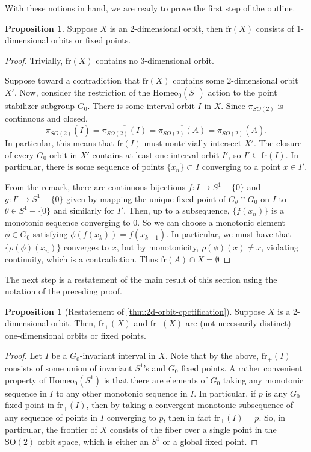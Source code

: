 \documentclass[10pt, oneside]{article}
\newcommand{\SO}[1][2]{\text{SO}(#1)}
\newcommand{\homeo}[1][S^1]{\text{Homeo}_0(#1)}
\theoremstyle{definition}
\newtheorem{prop}{Proposition}[section]
\newtheorem*{prop*}{Proposition}
\theoremstyle{definition}
\begin{document}
With these notions in hand, we are ready to prove the first step of the outline.

\begin{prop}
    Suppose $X$ is an 2-dimensional orbit, then $\text{fr}(X)$ consists of 1-dimensional orbits or fixed points.
\end{prop}

\begin{proof}
    Trivially, $\text{fr}(X)$ contains no 3-dimensional orbit.

    Suppose toward a contradiction that $\text{fr}(X)$ contains some 2-dimensional orbit $X'$. Now, consider the restriction of the $\homeo$ action to the point stabilizer subgroup $G_0$. There is some interval orbit $I$ in $X$. Since $\pi_{SO(2)}$ is continuous and closed, $$\pi_{SO(2)}(\bar{I}) = \overline{\pi_{SO(2)}(I)} = \overline{\pi_{SO(2)}(A)} = \pi_{SO(2)}(\bar{A}).$$ In particular, this means that $\text{fr}(I)$ must nontrivially intersect $X'$. The closure of every $G_0$ orbit in $X'$ contains at least one interval orbit $I'$, so $I'\subseteq \text{fr}(I)$. In particular, there is some sequence of points $\{x_n\}\subset I$ converging to a point $x\in I'$.

    From the remark, there are continuous bijections $f:I\to S^1-\{0\}$ and $g:I'\to S^1-\{0\}$ given by mapping the unique fixed point of $G_\theta\cap G_0$ on $I$ to $\theta\in S^1 - \{0\}$ and similarly for $I'$. Then, up to a subsequence, $\{f(x_n)\}$ is a monotonic sequence converging to 0. So we can choose a monotonic element $\phi\in G_0$ satisfying $\phi(f(x_k)) = f(x_{k+1})$. In particular, we must have that $\{\rho(\phi)( x_n)\}$ converges to $x$, but by monotonicity, $\rho(\phi)(x) \neq x$, violating continuity, which is a contradiction. Thus $\text{fr}(A)\cap X = \emptyset$
\end{proof}

The next step is a restatement of the main result of this section using the notation of the preceding proof.

\begin{prop*}[Restatement of \cref{thm:2d-orbit-cpctification}]
    Suppose $X$ is a 2-dimensional orbit. Then, $\text{fr}_+(X)$ and $\text{fr}_-(X)$ are (not necessarily distinct) one-dimensional orbits or fixed points.
\end{prop*}

\begin{proof}
     Let $I$ be a $G_0$-invariant interval in $X$. Note that by the above, $\text{fr}_+(I)$ consists of some union of invariant $S^1$'s and $G_0$ fixed points. A rather convenient property of $\homeo$ is that there are elements of $G_0$ taking any monotonic sequence in $I$ to any other monotonic sequence in $I$. In particular, if $p$ is any $G_0$ fixed point in $\text{fr}_+(I)$, then by taking a convergent monotonic subsequence of any sequence of points in $I$ converging to $p$, then in fact $\text{fr}_+(I) = p$. So, in particular, the frontier of $X$ consists of the fiber over a single point in the $\SO$ orbit space, which is either an $S^1$ or a global fixed point.
\end{proof}
\end{document}
